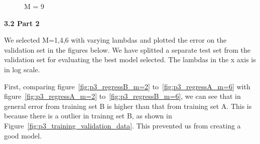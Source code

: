 \begin{figure}[!htb]
  \caption{M = 9}\label{fig:figures/p3_bishop_m=9}
\endminipage\hfill
\end{figure}

{\bfseries 3.2 Part 2}

We selected M=1,4,6 with varying lambdas and plotted the error on the validation set in the figures below. We have splitted a separate test set from the validation set for evaluating the best model selected. The lambdas in the x axis is in log scale. 
 
First, comparing figure~\ref{fig:p3_regressB_m=2} to~\ref{fig:p3_regressA_m=6} with figure~\ref{fig:p3_regressA_m=2} to~\ref{fig:p3_regressB_m=6}, we can see that in general error from training set B is higher than that from training set A. This is because there is a outlier in trainng set B, as shown in Figure~\ref{fig:p3_training_validation_data}. This prevented us from creating a good model. 

